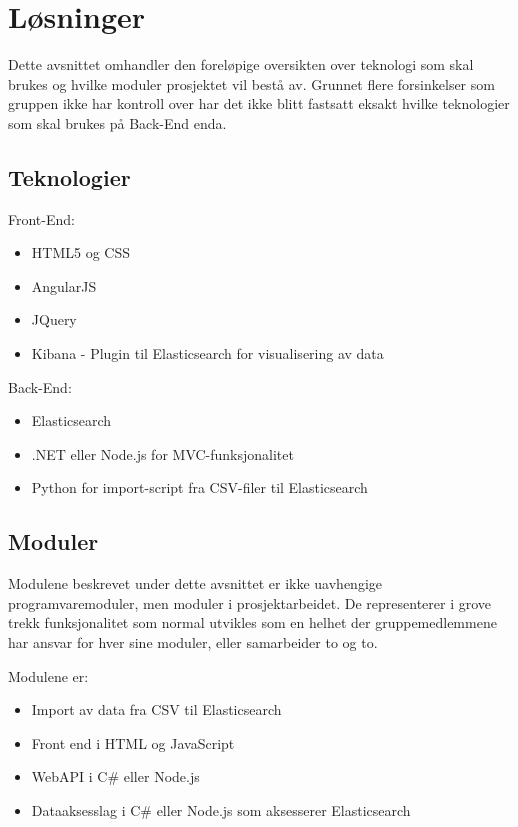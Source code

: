 \chapter{Løsninger}
Dette avsnittet omhandler den foreløpige oversikten over teknologi som skal brukes og hvilke moduler prosjektet vil bestå av. Grunnet flere forsinkelser som gruppen ikke har kontroll over har det ikke blitt fastsatt eksakt hvilke teknologier som skal brukes på Back-End enda.


\section{Teknologier}
Front-End:
\begin{itemize}
\item HTML5 og CSS
\item AngularJS
\item JQuery
\item Kibana - Plugin til Elasticsearch for visualisering av data
\end{itemize}

Back-End:
\begin{itemize}
\item Elasticsearch
\item .NET eller Node.js for MVC-funksjonalitet
\item Python for import-script fra CSV-filer til Elasticsearch
\end{itemize}

\section{Moduler}
Modulene beskrevet under dette avsnittet er ikke uavhengige programvaremoduler, men moduler i prosjektarbeidet. De representerer i grove trekk funksjonalitet som normal utvikles som en helhet der gruppemedlemmene har ansvar for hver sine moduler, eller samarbeider to og to.

Modulene er:
\begin{itemize}
\item Import av data fra CSV til Elasticsearch
\item Front end i HTML og JavaScript
\item WebAPI i C\# eller Node.js
\item Dataaksesslag i C\# eller Node.js som aksesserer Elasticsearch
\end{itemize}
